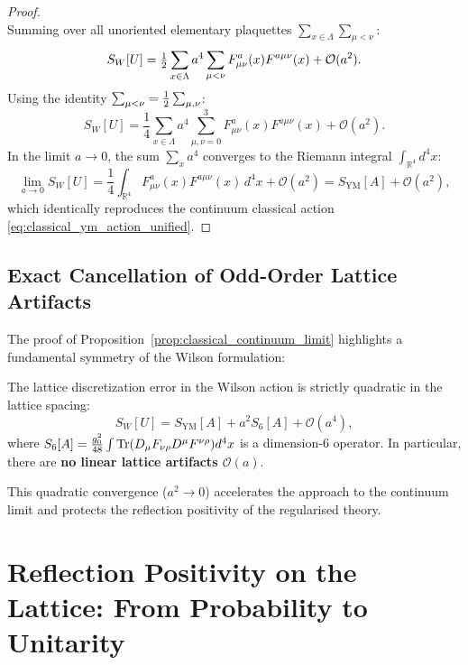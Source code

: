 \begin{proof}
\begin{equation}
\end{equation}
Summing over all unoriented elementary plaquettes $\sum_{x \in \Lambda} \sum_{\mu < \nu}$:
\begin{equation}
S_W[U] = \tfrac{1}{2} \sum_{x \in \Lambda} a^4 \sum_{\mu < \nu} F_{\mu\nu}^a(x) F^{a\mu\nu}(x) + \mathcal{O}(a^2).
\end{equation}
Using the identity $\sum_{\mu < \nu} = \tfrac{1}{2} \sum_{\mu, \nu}$:
\begin{equation}
S_W[U] = \frac{1}{4} \sum_{x \in \Lambda} a^4 \sum_{\mu, \nu=0}^3 F_{\mu\nu}^a(x) F^{a\mu\nu}(x) + \mathcal{O}(a^2).
\end{equation}
In the limit $a \to 0$, the sum $\sum_x a^4$ converges to the Riemann integral $\int_{\mathbb{R}^4} d^4x$:
\begin{equation}
\lim_{a \to 0} S_W[U] = \frac{1}{4} \int_{\mathbb{R}^4} F_{\mu\nu}^a(x) F^{a\mu\nu}(x) \, d^4x + \mathcal{O}(a^2) = S_{\mathrm{YM}}[A] + \mathcal{O}(a^2),
\end{equation}
which identically reproduces the continuum classical action \eqref{eq:classical_ym_action_unified}.
\end{proof}

\subsection{Exact Cancellation of Odd-Order Lattice Artifacts}
\label{subsec:odd_order_cancellation}
The proof of Proposition~\ref{prop:classical_continuum_limit} highlights a fundamental symmetry of the Wilson formulation:
\begin{corollary}
\label{cor:no_linear_lattice_artifacts}
The lattice discretization error in the Wilson action is strictly quadratic in the lattice spacing:
\begin{equation}
S_W[U] = S_{\mathrm{YM}}[A] + a^2 S_6[A] + \mathcal{O}(a^4),
\end{equation}
where $S_6[A] = \frac{g_0^2}{48} \int \mathrm{Tr}(D_\mu F_{\nu\rho} D^\mu F^{\nu\rho}) d^4x$ is a dimension-6 operator. In particular, there are \textbf{no linear lattice artifacts $\mathcal{O}(a)$}.
\end{corollary}
This quadratic convergence ($a^2 \to 0$) accelerates the approach to the continuum limit and protects the reflection positivity of the regularised theory.


\section{Reflection Positivity on the Lattice: From Probability to Unitarity}
\label{sec:reflection_positivity}

